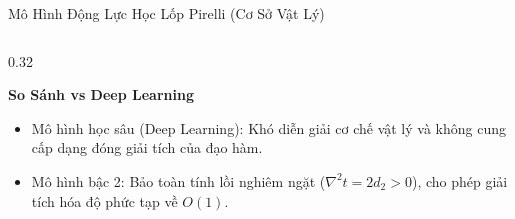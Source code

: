 \documentclass[aspectratio=169, 10pt]{beamer}
\begin{document}
\begin{frame}{Mô Hình Động Lực Học Lốp Pirelli (Cơ Sở Vật Lý)}
\begin{columns}[T]
    \begin{column}{0.32\textwidth}
      \begin{exampleblock}{\centering \textbf{So Sánh vs Deep Learning}}
        \scriptsize
        \begin{itemize}
          \item Mô hình học sâu (Deep Learning): Khó diễn giải cơ chế vật lý và không cung cấp dạng đóng giải tích của đạo hàm.
          \item Mô hình bậc 2: Bảo toàn tính lồi nghiêm ngặt ($\nabla^2 t = 2d_2 > 0$), cho phép giải tích hóa độ phức tạp về \textbf{$O(1)$}.
        \end{itemize}
      \end{exampleblock}
    \end{column}
  \end{columns}

  \vspace{0.12cm}
  \begin{center}
  \end{center}
\end{frame}
\end{document}

